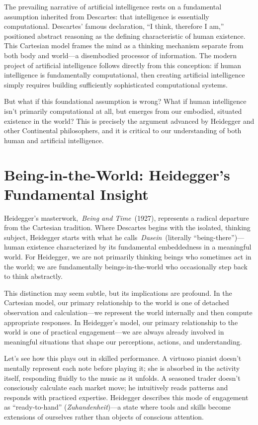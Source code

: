 \documentclass[
  Letterpaper,
]{scrbook}
\begin{document}
The prevailing narrative of artificial intelligence rests on a
fundamental assumption inherited from Descartes: that intelligence is
essentially computational. Descartes' famous declaration, ``I think,
therefore I am,'' positioned abstract reasoning as the defining
characteristic of human existence. This Cartesian model frames the mind
as a thinking mechanism separate from both body and world---a
disembodied processor of information. The modern project of artificial
intelligence follows directly from this conception: if human
intelligence is fundamentally computational, then creating artificial
intelligence simply requires building sufficiently sophisticated
computational systems.

But what if this foundational assumption is wrong? What if human
intelligence isn't primarily computational at all, but emerges from our
embodied, situated existence in the world? This is precisely the
argument advanced by Heidegger and other Continental philosophers, and
it is critical to our understanding of both human and artificial
intelligence.

\section{Being-in-the-World: Heidegger's Fundamental
Insight}\label{being-in-the-world-heideggers-fundamental-insight}

Heidegger's masterwork,~\emph{Being and Time}~(1927), represents a
radical departure from the Cartesian tradition. Where Descartes begins
with the isolated, thinking subject, Heidegger starts with what he
calls~\emph{Dasein}~(literally ``being-there'')---human existence
characterized by its fundamental embeddedness in a meaningful world. For
Heidegger, we are not primarily thinking beings who sometimes act in the
world; we are fundamentally beings-in-the-world who occasionally step
back to think abstractly.

This distinction may seem subtle, but its implications are profound. In
the Cartesian model, our primary relationship to the world is one of
detached observation and calculation---we represent the world internally
and then compute appropriate responses. In Heidegger's model, our
primary relationship to the world is one of practical engagement---we
are always already involved in meaningful situations that shape our
perceptions, actions, and understanding.

Let's see how this plays out in skilled performance. A virtuoso pianist
doesn't mentally represent each note before playing it; she is absorbed
in the activity itself, responding fluidly to the music as it unfolds. A
seasoned trader doesn't consciously calculate each market move; he
intuitively reads patterns and responds with practiced expertise.
Heidegger describes this mode of engagement as ``ready-to-hand''
(\emph{Zuhandenheit})---a state where tools and skills become extensions
of ourselves rather than objects of conscious attention.
\end{document}

